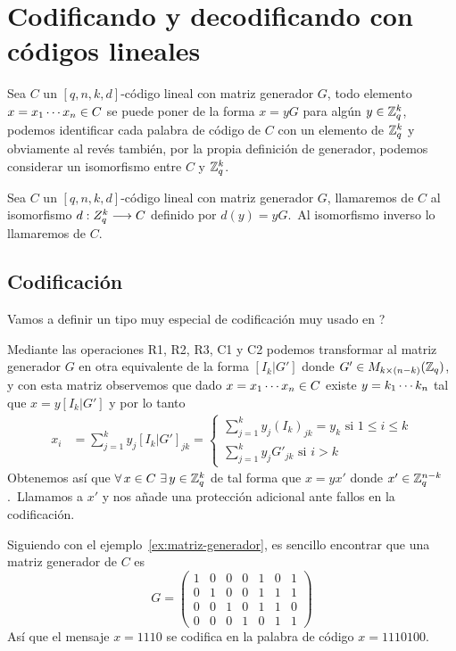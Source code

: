 \section{Codificando y decodificando con códigos lineales}
Sea $C$ un $[q, n, k, d]$-código lineal con matriz generador $G$, todo elemento $x=x_1\cdots x_{n}\in C$ se puede poner de la forma $x=yG$ para algún $y\in\mathbb{Z}_q^k$, podemos identificar cada palabra de código de $C$ con un elemento de $\mathbb{Z}_q^k$ y obviamente al revés también, por la propia definición de generador, podemos considerar un isomorfismo entre $C$ y $\mathbb{Z}_q^k$.

\begin{definition}
	Sea $C$ un $[q, n, k, d]$-código lineal con matriz generador $G$, llamaremos  de $C$ al isomorfismo $d:Z_q^k\longrightarrow C$ definido por $d(y)=yG$.\ Al isomorfismo inverso lo llamaremos  de $C$.
\end{definition}

\subsection{Codificación}
Vamos a definir un tipo muy especial de codificación muy usado en ?

Mediante las operaciones R1, R2, R3, C1 y C2 podemos transformar al matriz generador $G$ en otra equivalente de la forma $[I_k|G']$ donde $G'\in M_{k\times (n-k)}(\mathbb{Z}_q)$, y con esta matriz observemos que dado $x=x_1\cdots x_{n}\in C$ existe $y=k_1\cdots k_{n}$ tal que $x=y[I_k|G']$ y por lo tanto
\begin{align*}
	x_i &= \sum_{j=1}^k y_j [I_k|G']_{jk}=\begin{cases}
		                                     \sum\limits_{j=1}^k y_j (I_k)_{jk}=y_k \text{ si $1\leq i \leq k$} \\
		                                     \sum\limits_{j=1}^k y_j G'_{jk} \text{ si $i > k$}
	\end{cases}
\end{align*}
Obtenemos así que $\forall x\in C\ \exists y\in\Z_q^k$ de tal forma que $x=yx'$ donde $x'\in\mathbb{Z}_q^{n-k}$.\ Llamamos a $x'$  y nos añade una protección adicional ante fallos en la codificación.

\begin{example}
	Siguiendo con el ejemplo~\ref{ex:matriz-generador}, es sencillo encontrar que una matriz generador de $C$ es
	\[
		G=\begin{pmatrix*}
				1&0&0&0&1&0&1\\
				0&1&0&0&1&1&1\\
				0&0&1&0&1&1&0\\
				0&0&0&1&0&1&1
		\end{pmatrix*}
	\]
	Así que el mensaje $x=1110$ se codifica en la palabra de código $x=1110100$.
\end{example}

